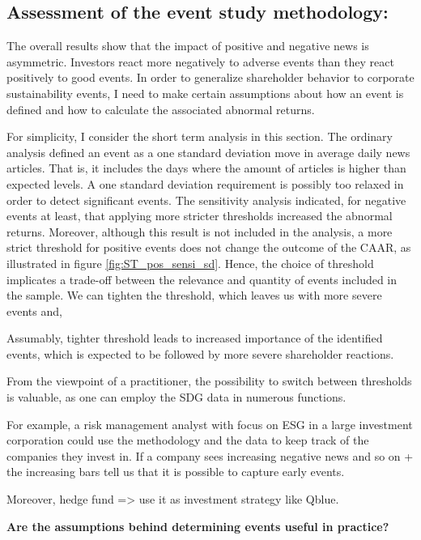 
\subsection{Assessment of the event study methodology:}

The overall results show that the impact of positive and negative news is asymmetric. Investors react more negatively to adverse events than they react positively to good events. In order to generalize shareholder behavior to corporate sustainability events, I need to make certain assumptions about how an event is defined and how to calculate the associated abnormal returns. 

For simplicity, I consider the short term analysis in this section. The ordinary analysis defined an event as a one standard deviation move in average daily news articles. That is, it includes the days where the amount of articles is higher than expected levels. A one standard deviation requirement is possibly too relaxed in order to detect significant events. The sensitivity analysis indicated, for negative events at least, that applying more stricter thresholds increased the abnormal returns. Moreover, although this result is not included in the analysis, a more strict threshold for positive events does not change the outcome of the CAAR, as illustrated in figure \ref{fig:ST_pos_sensi_sd}. Hence, the choice of threshold implicates a trade-off between the relevance and quantity of events included in the sample. We can tighten the threshold, which leaves us with more severe events and, 

Assumably, tighter threshold leads to increased importance of the identified events, which is expected to be followed by more severe shareholder reactions.

From the viewpoint of a practitioner, the possibility to switch between thresholds is valuable, as one can employ the SDG data in numerous functions. 

For example, a risk management analyst with focus on ESG in a large investment corporation could use the methodology and the data to keep track of the companies they invest in. If a company sees increasing negative news and so on + the increasing bars tell us that it is possible to capture early events. 

Moreover, hedge fund => use it as investment strategy like Qblue. 



\textbf{Are the assumptions behind determining events useful in practice?}

